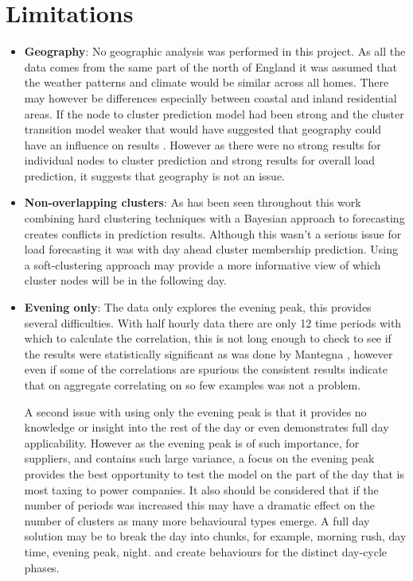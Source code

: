 \section{Limitations}
\begin{itemize}
    \item \textbf{Geography}: No geographic analysis was performed in this project. As all the data comes from the same part of the north of England it was assumed that the weather patterns and climate would be similar across all homes. There may however be differences especially between coastal and inland residential areas. If the node to cluster prediction model had been strong and the cluster transition model weaker that would have suggested that geography could have an influence on results . However as there were no strong results for individual nodes to cluster prediction and strong results for overall load prediction, it suggests that geography is not an issue.

    \item \textbf{Non-overlapping clusters}: As has been seen throughout this work combining hard clustering techniques with a Bayesian approach to forecasting creates conflicts in prediction results. Although this wasn't a serious issue for load forecasting it was with day ahead cluster membership prediction. Using a soft-clustering approach may provide a more informative view of which cluster nodes will be in the following day.

    \item \textbf{Evening only}: The data only explores the evening peak, this provides several difficulties. With half hourly data there are only 12 time periods with which to calculate the correlation, this is not long enough to check to see if the results were statistically significant as was done by  Mantegna \cite{mantegna1999}, however even if some of the correlations are spurious the consistent results indicate that on aggregate correlating on so few examples was not a problem. 
    
    A second issue with using only the evening peak is that it provides no knowledge or insight into the rest of the day or even demonstrates full day applicability. However as the evening peak is of such importance, for suppliers, and contains such large variance, a focus on the evening peak provides the best opportunity to test the model on the part of the day that is most taxing to power companies. It also should be considered that if the number of periods was increased this may have a dramatic effect on the number of clusters as many more behavioural types emerge. A full day solution may be to break the day into chunks, for example, morning rush, day time, evening peak, night. and create behaviours for the distinct day-cycle phases.


\end{itemize}
